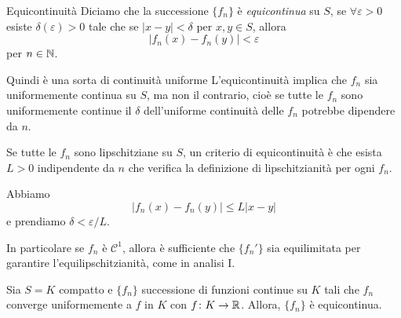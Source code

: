 \documentclass[a4paper]{article}
\begin{document}
\begin{radioactive}
\begin{snippetdefinition}{Equicontinuità}
    Diciamo che la successione \(\{f_n\}\) è \emph{equicontinua}
    su \(S\), se \(\forall \varepsilon > 0\) esiste \(\delta(\varepsilon) > 0\)
    tale che se \(|x-y| < \delta\) per \(x,y \in S\), allora
    \[
        |f_n(x) - f_n(y)| < \varepsilon
    \]
    per \(n \in \mathbb{N}\).
\end{snippetdefinition}
\end{radioactive}

\begin{radioactive}
Quindi è una sorta di continuità uniforme
L'equicontinuità implica che \(f_n\) sia uniformemente continua su \(S\), ma non il contrario,
cioè se tutte le \(f_n\) sono uniformemente continue il \(\delta\) dell'uniforme continuità delle \(f_n\)
potrebbe dipendere da \(n\).
\end{radioactive}

\begin{radioactive}
\begin{snippetproposition}{}
    Se tutte le \(f_n\) sono lipschitziane su \(S\),
    un criterio di equicontinuità è che esista \(L > 0\) indipendente da \(n\)
    che verifica la definizione di lipschitzianità per ogni \(f_n\).
\end{snippetproposition}
\end{radioactive}

\begin{radioactive}
\begin{snippetproof}{}
    Abbiamo \[
        |f_n(x) - f_n(y)| \leq L|x-y|
    \]
    e prendiamo \(\delta < \varepsilon / L\).
\end{snippetproof}
\end{radioactive}

\begin{radioactive}
In particolare se \(f_n\) è \(\mathcal C^1\),
allora è sufficiente che \(\{f_n'\}\) sia equilimitata per garantire l'equilipschitzianità,
come in analisi I.
\end{radioactive}

\begin{radioactive}
\begin{snippetproposition}{}
    Sia \(S=K\) compatto e \(\{f_n\}\) successione di funzioni continue
    su \(K\) tali che \(f_n\) converge uniformemente a \(f\) in \(K\)
    con \(f \colon K \to \mathbb{R}\).
    Allora, \(\{f_n\}\) è equicontinua.
\end{snippetproposition}
\end{radioactive}
\end{document}
